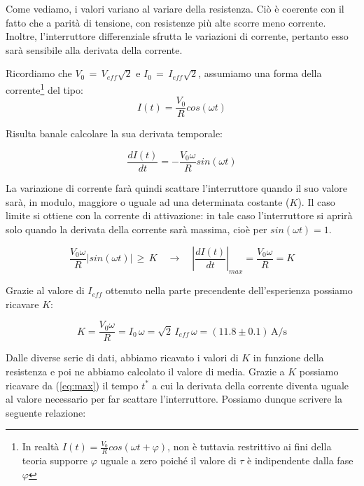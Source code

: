 Come vediamo, i valori variano al variare della resistenza. Ciò è coerente con il fatto che a parità di tensione, con resistenze più alte scorre meno corrente. Inoltre, l'interruttore differenziale sfrutta le variazioni di corrente, pertanto esso sarà sensibile alla derivata della corrente.

\noindent Ricordiamo che $V_0 \, = \, V_{eff} \sqrt{2}$ e $I_0 \, = \, I_{eff} \sqrt{2}$, assumiamo una forma della corrente\footnote{In realtà $I(t)=\frac{V_0}{R}cos(\omega t + \varphi)$, non è tuttavia restrittivo ai fini della teoria supporre $\varphi$ uguale a zero poiché il valore di $\tau$ è indipendente dalla fase $\varphi$} del tipo:
\begin{equation}
I(t)=\frac{V_0}{R}cos(\omega t)
\label{eq:corrente}
\end{equation}

Risulta banale calcolare la sua derivata temporale:

\begin{equation}
\frac{dI(t)}{dt}=-\frac{V_0 \omega}{R}sin(\omega t)
\label{eq:derivata}
\end{equation}

\noindent La variazione di corrente farà quindi scattare l'interruttore quando il suo valore sarà, in modulo, maggiore o uguale ad una determinata costante ($K$). Il caso limite si ottiene con la corrente di attivazione: in tale caso l'interruttore si aprirà solo quando la derivata della corrente sarà massima, cioè per $sin(\omega t) = 1$.

\begin{equation}
\frac{V_0 \omega}{R}|sin(\omega t)| \, \geq \, K	\quad \longrightarrow  \quad	
\left\vert \frac{dI(t)}{dt} \right\vert_{max} = \frac{V_0 \omega}{R} = K
\label{eq:max}
\end{equation}

\noindent Grazie al valore di $I_{eff}$ ottenuto nella parte precendente dell'esperienza possiamo ricavare $K$:

\begin{equation}
K = \frac{V_0 \omega}{R} = I_0 \,\omega = \sqrt{2}\,I_{eff} \,\omega  = (11.8 \pm 0.1)\, \si{\ampere\per\second}
\label{eq:K}
\end{equation}

\noindent Dalle diverse serie di dati, abbiamo ricavato i valori di $K$ in funzione della resistenza e poi ne abbiamo calcolato il valore di media. Grazie a $K$ possiamo ricavare da (\ref{eq:max}) il tempo $t^*$ a cui la derivata della corrente diventa uguale al valore necessario per far scattare l'interruttore. Possiamo dunque scrivere la seguente relazione:

